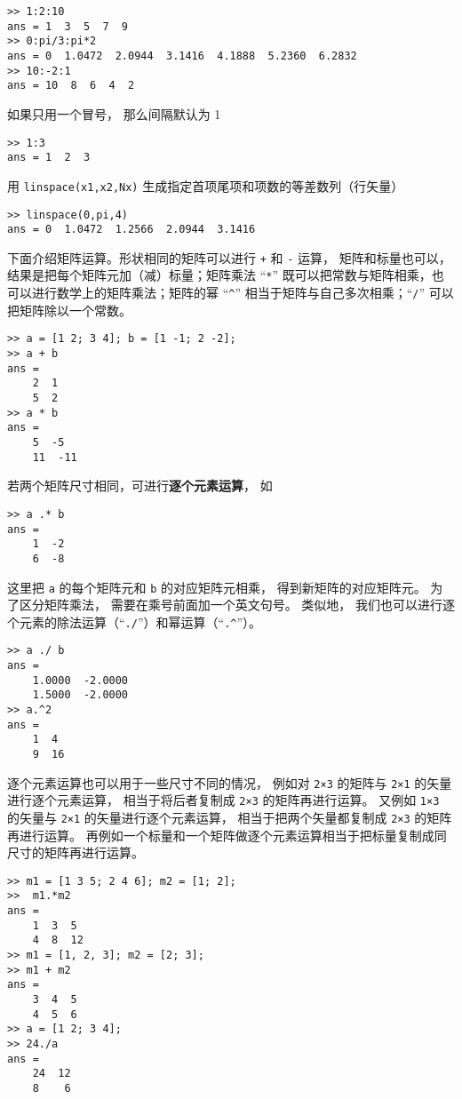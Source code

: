 \begin{lstlisting}[language=matlabC]
>> 1:2:10
ans = 1  3  5  7  9
>> 0:pi/3:pi*2
ans = 0  1.0472  2.0944  3.1416  4.1888  5.2360  6.2832
>> 10:-2:1
ans = 10  8  6  4  2
\end{lstlisting}
如果只用一个冒号， 那么间隔默认为 1
\begin{lstlisting}[language=matlabC]
>> 1:3
ans = 1  2  3
\end{lstlisting}
用 \verb|linspace(x1,x2,Nx)| 生成指定首项尾项和项数的等差数列（行矢量）
\begin{lstlisting}[language=matlabC]
>> linspace(0,pi,4)
ans = 0  1.0472  1.2566  2.0944  3.1416
\end{lstlisting}

下面介绍矩阵运算。形状相同的矩阵可以进行 \verb|+| 和 \verb|-| 运算， 矩阵和标量也可以， 结果是把每个矩阵元加（减）标量；矩阵乘法 “\verb|*|” 既可以把常数与矩阵相乘，也可以进行数学上的矩阵乘法；矩阵的幂 “\verb|^|” 相当于矩阵与自己多次相乘；“\verb|/|” 可以把矩阵除以一个常数。
\begin{lstlisting}[language=matlabC]
>> a = [1 2; 3 4]; b = [1 -1; 2 -2];
>> a + b
ans =
    2  1
    5  2
>> a * b
ans =
    5  -5
    11  -11
\end{lstlisting}
若两个矩阵尺寸相同，可进行\textbf{逐个元素运算}， 如
\begin{lstlisting}[language=matlabC]
>> a .* b
ans =
    1  -2
    6  -8
\end{lstlisting}
这里把 \verb|a| 的每个矩阵元和 \verb|b| 的对应矩阵元相乘， 得到新矩阵的对应矩阵元。 为了区分矩阵乘法， 需要在乘号前面加一个英文句号。 类似地， 我们也可以进行逐个元素的除法运算（“\verb|./|”）和幂运算（“\verb|.^|”）。
\begin{lstlisting}[language=matlabC]
>> a ./ b
ans =
    1.0000  -2.0000
    1.5000  -2.0000
>> a.^2
ans =
    1  4
    9  16
\end{lstlisting}

逐个元素运算也可以用于一些尺寸不同的情况， 例如对 \verb|2×3| 的矩阵与 \verb|2×1| 的矢量进行逐个元素运算， 相当于将后者复制成 \verb|2×3| 的矩阵再进行运算。 又例如 \verb|1×3| 的矢量与 \verb|2×1| 的矢量进行逐个元素运算， 相当于把两个矢量都复制成 \verb|2×3| 的矩阵再进行运算。 再例如一个标量和一个矩阵做逐个元素运算相当于把标量复制成同尺寸的矩阵再进行运算。

\begin{lstlisting}[language=matlabC]
>> m1 = [1 3 5; 2 4 6]; m2 = [1; 2];
>>  m1.*m2
ans =
    1  3  5
    4  8  12
>> m1 = [1, 2, 3]; m2 = [2; 3];
>> m1 + m2
ans =
    3  4  5
    4  5  6
>> a = [1 2; 3 4];
>> 24./a
ans =
    24  12
    8    6
\end{lstlisting}

